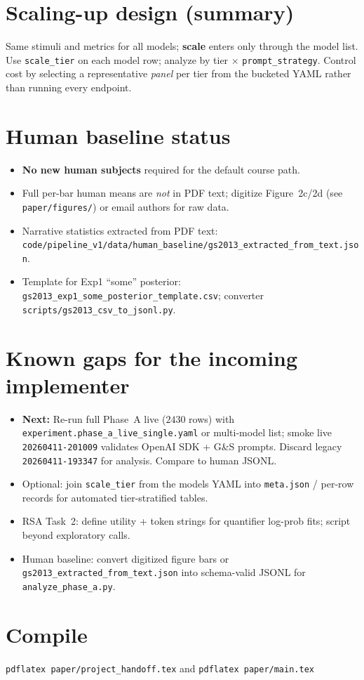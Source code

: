 \documentclass[11pt]{article}
\begin{document}
\section{Scaling-up design (summary)}
Same stimuli and metrics for all models; \textbf{scale} enters only through the model list. Use \texttt{scale\_tier} on each model row; analyze by tier $\times$ \texttt{prompt\_strategy}. Control cost by selecting a representative \emph{panel} per tier from the bucketed YAML rather than running every endpoint.

\section{Human baseline status}
\begin{itemize}
  \item \textbf{No new human subjects} required for the default course path.
  \item Full per-bar human means are \emph{not} in PDF text; digitize Figure~2c/2d (see \texttt{paper/figures/}) or email authors for raw data.
  \item Narrative statistics extracted from PDF text: \texttt{code/pipeline\_v1/data/human\_baseline/gs2013\_extracted\_from\_text.json}.
  \item Template for Exp1 ``some'' posterior: \texttt{gs2013\_exp1\_some\_posterior\_template.csv}; converter \texttt{scripts/gs2013\_csv\_to\_jsonl.py}.
\end{itemize}

\section{Known gaps for the incoming implementer}
\begin{itemize}
  \item \textbf{Next:} Re-run full Phase~A live ($2430$ rows) with \texttt{experiment.phase\_a\_live\_single.yaml} or multi-model list; smoke live \texttt{20260411-201009} validates OpenAI SDK + G\&S prompts. Discard legacy \texttt{20260411-193347} for analysis. Compare to human JSONL.
  \item Optional: join \texttt{scale\_tier} from the models YAML into \texttt{meta.json} / per-row records for automated tier-stratified tables.
  \item RSA Task~2: define utility + token strings for quantifier log-prob fits; script beyond exploratory calls.
  \item Human baseline: convert digitized figure bars or \texttt{gs2013\_extracted\_from\_text.json} into schema-valid JSONL for \texttt{analyze\_phase\_a.py}.
\end{itemize}

\section*{Compile}
\texttt{pdflatex paper/project\_handoff.tex} \quad and \quad \texttt{pdflatex paper/main.tex}
\end{document}
